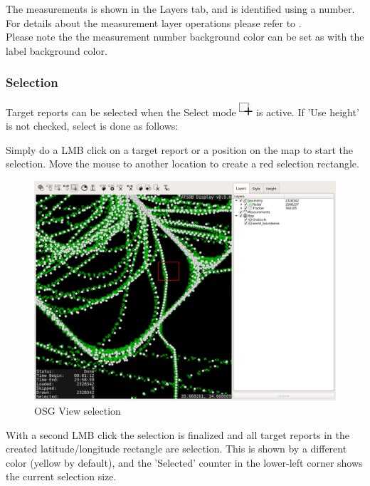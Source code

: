 The measurements is shown in the Layers tab, and is identified using a number. For details about the measurement layer operations please refer to . \\

Please note the the measurement number background color can be set as with the label background color. 

\subsubsection{Selection}
\label{sec:osgview_selection}

Target reports can be selected when the Select mode \includegraphics[width=0.5cm,frame]{../../data/icons/select_action.png} is active. If 'Use height' is not checked, select is done as follows:

Simply do a LMB click on a target report or a position on the map to start the selection. Move the mouse to another location to create a red selection rectangle.

\begin{figure}[H]
    \hspace*{-2.5cm}
    \includegraphics[width=19cm,frame]{figures/osgview_select1.png}
  \caption{OSG View selection}
\end{figure}

With a second LMB click the selection is finalized and all target reports in the created latitude/longitude rectangle are selection. This is shown by a different color (yellow by default), and the 'Selected' counter in the lower-left corner shows the current selection size.

